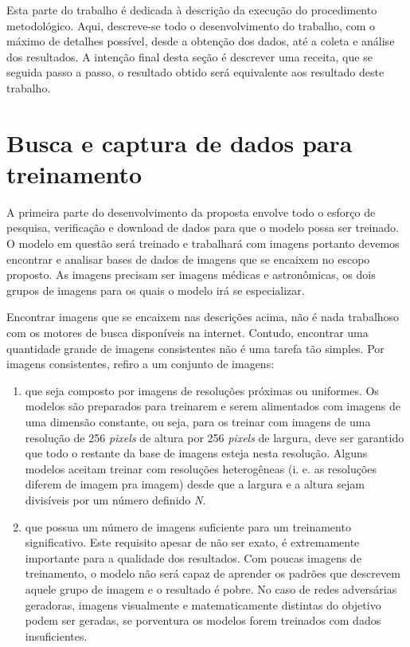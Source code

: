 \label{desenvolvimento}

Esta parte do trabalho é dedicada à descrição da execução do procedimento metodológico. Aqui, descreve-se todo o desenvolvimento do trabalho, com o máximo de detalhes possível, desde a obtenção dos dados, até a coleta e análise dos resultados. A intenção final desta seção é descrever uma receita, que se seguida passo a passo, o resultado obtido será equivalente aos resultado deste trabalho.

\section{Busca e captura de dados para treinamento}

A primeira parte do desenvolvimento da proposta envolve todo o esforço de pesquisa, verificação e download de dados para que o modelo possa ser treinado. O modelo em questão será treinado e trabalhará com imagens portanto devemos encontrar e analisar bases de dados de imagens que se encaixem no escopo proposto. As imagens precisam ser imagens médicas e astronômicas, os dois grupos de imagens para os quais o modelo irá se especializar.

Encontrar imagens que se encaixem nas descrições acima, não é nada trabalhoso com os motores de busca disponíveis na internet. Contudo, encontrar uma quantidade grande de imagens consistentes não é uma tarefa tão simples. Por imagens consistentes, refiro a um conjunto de imagens:

\begin{enumerate}
    \item que seja composto por imagens de resoluções próximas ou uniformes. Os modelos são preparados para treinarem e serem alimentados com imagens de uma dimensão constante, ou seja, para os treinar com imagens de uma resolução de 256 \textit{pixels} de altura por 256 \textit{pixels} de largura, deve ser garantido que todo o restante da base de imagens esteja nesta resolução. Alguns modelos aceitam treinar com resoluções heterogêneas (i. e. as resoluções diferem de imagem pra imagem) desde que a largura e a altura sejam divisíveis por um número definido \textit{N}.

    \item que possua um número de imagens suficiente para um treinamento significativo. Este requisito apesar de não ser exato, é extremamente importante para a qualidade dos resultados. Com poucas imagens de treinamento, o modelo não será capaz de aprender os padrões que descrevem aquele grupo de imagem e o resultado é pobre. No caso de redes adversárias geradoras, imagens visualmente e matematicamente distintas do objetivo podem ser geradas, se porventura os modelos forem treinados com dados insuficientes.
\end{enumerate}

